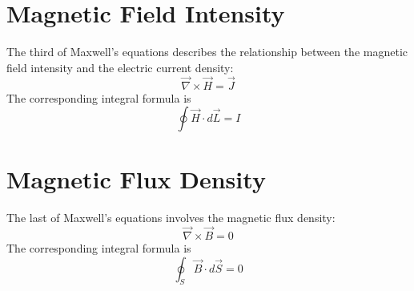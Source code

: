 \section{Magnetic Field Intensity}

The third of Maxwell's equations describes the relationship between the
magnetic field intensity and the electric current density:
\begin{equation}
\vec{\nabla} \times \vec{H} = \vec{J}
\end{equation}
The corresponding integral formula is
\begin{equation}
\oint \vec{H} \cdot d\vec{L} = I
\end{equation}

\section{Magnetic Flux Density}

The last of Maxwell's equations involves the magnetic flux density:
\begin{equation}
\vec{\nabla} \times \vec{B} = 0
\end{equation}
The corresponding integral formula is
\begin{equation}
\oint_S \vec{B} \cdot d\vec{S} = 0
\end{equation}
